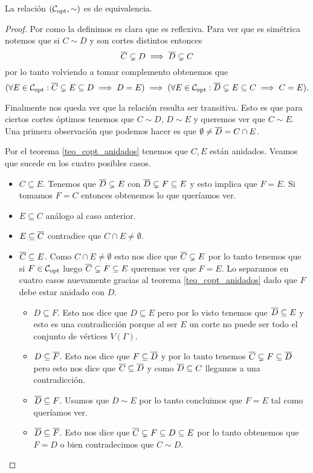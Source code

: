 \documentclass[tesis.tex]{subfiles}
\begin{document}
\begin{prop}
	La relación $({\cal C}_{\text{opt}}, \sim)$ es de equivalencia.
\end{prop}
\begin{proof}
	Por como la definimos es clara que es reflexiva.
	Para ver que es simétrica notemos que si $C \sim D$ y son cortes distintos entonces  
	\[
		\overline C \subsetneq D \implies \overline D \subsetneq C
	\]
	por lo tanto volviendo a tomar complemento obtenemos que
	\[
(	\forall E \in {\cal C}_{\text{opt}} : \overline C \subsetneq E \subseteq D \implies D = E) \implies 
	(\forall E \in {\cal C}_{\text{opt}} : \overline D \subsetneq E \subseteq C \implies C = E).
	\]
	
	Finalmente nos queda ver que la relación resulta ser transitiva.
	Esto es que para ciertos cortes óptimos tenemos que $C \sim D$, $D \sim E$ y queremos ver que $C \sim E$.
	Una primera observación que podemos hacer es que $\emptyset \neq \overline D = C \cap E$.

	
	Por el teorema \ref{teo_copt_anidados} tenemos que $C,E$ están anidados.
	Veamos que sucede en los cuatro posibles casos.
	\begin{itemize}
		\item $C \subseteq E$. 
		Tenemos que $\overline D \subsetneq E$ con $\overline D \subsetneq F \subseteq E$ y esto implica que $F=E$.
		Si tomamos $F = C$ entonces obtenemos lo que queríamos ver.
		\item $E \subseteq C$ análogo al caso anterior.
		\item $E \subseteq \overline C$ contradice que $C \cap E \neq \emptyset$.
		\item $\overline C \subseteq E$.
		Como $C \cap E \neq \emptyset$ esto nos dice que $\overline C \subsetneq E$ por lo tanto tenemos que si $F \in {\cal C}_{\text{opt}}$ luego	$\overline C \subsetneq F \subseteq E$ queremos ver que $F=E$.
		Lo separamos en cuatro casos nuevamente gracias al teorema \ref{teo_copt_anidados} dado que $F$ debe estar anidado con $D$.
		\begin{itemize}
			\item $D \subseteq F$.
			Esto nos dice que $D \subseteq E$ pero por lo visto tenemos que $\overline D \subseteq E$ y esto es una contradicción porque al ser $E$ un corte no puede ser todo el conjunto de vértices $V(\Gamma)$.
			\item $D \subseteq \overline F$. 
			Esto nos dice que $F \subseteq \overline D$ y por lo tanto tenemos $\overline C \subsetneq F \subseteq \overline D$ pero esto nos dice que $\overline C \subseteq \overline D$ y como $\overline D \subseteq C$ llegamos a una contradicción.
			\item $\overline D \subseteq F$.
			Usamos que $D \sim E$ por lo tanto concluimos que $F=E$ tal como queríamos ver.			
			\item $\overline D \subseteq \overline F$.
			Esto nos dice que $\overline C \subsetneq F \subseteq D \subseteq E$ por lo tanto obtenemos que $F = D$ o bien contradecimos que $C \sim D$.
		\end{itemize}
	\end{itemize}
\end{proof}
\end{document}
